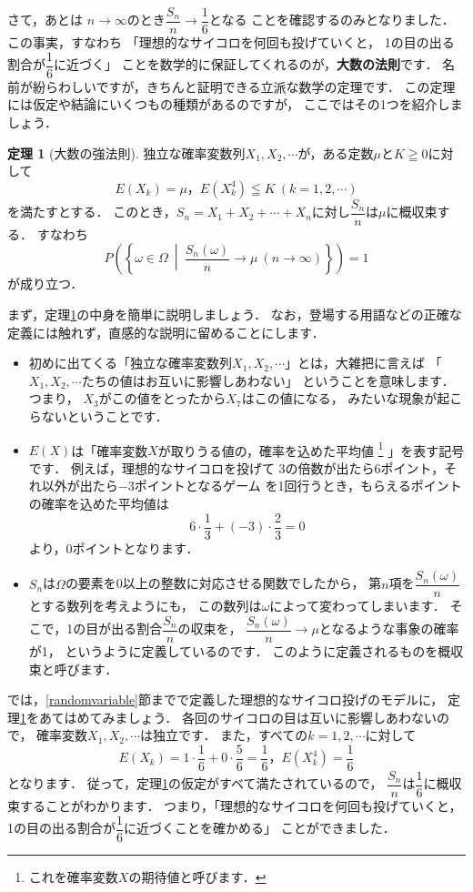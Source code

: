 \documentclass[./main]{subfiles} %
\theoremstyle{definition}
\newtheorem{hamadathm}[hamadadefi]{定理}
\begin{document}
さて，あとは
$n\to\infty$のとき$\dfrac{S_n}{n}\to\dfrac{1}{6}$となる
ことを確認するのみとなりました．
この事実，すなわち
「理想的なサイコロを何回も投げていくと，
1の目の出る割合が$\dfrac{1}{6}$に近づく」
ことを数学的に保証してくれるのが，\textbf{大数の法則}です．
名前が紛らわしいですが，きちんと証明できる立派な数学の定理です．
この定理には仮定や結論にいくつもの種類があるのですが，
ここではその1つを紹介しましょう．

\begin{hamadathm}[大数の強法則]\label{stronglawoflargenumber}
独立な確率変数列$X_1,X_2,\cdots$が，ある定数$\mu$と$K\geqq0$に対して
\[ E(X_k)=\mu，E(X_k^4)\leqq K\ (k=1,2,\cdots) \]
を満たすとする．
このとき，$S_n=X_1+X_2+\cdots+X_n$に対し$\dfrac{S_n}{n}$は$\mu$に概収束する．
すなわち
\[ P\left(\left\{\omega\in\Omega\ \middle|
\ \frac{S_n(\omega)}{n}\to\mu\ (n\to\infty)\right\}\right)=1 \]
が成り立つ．
\end{hamadathm}

まず，定理\ref{stronglawoflargenumber}の中身を簡単に説明しましょう．
なお，登場する用語などの正確な定義には触れず，直感的な説明に留めることにします．
\begin{itemize}
\item 初めに出てくる「独立な確率変数列$X_1,X_2,\cdots$」とは，大雑把に言えば
「$X_1,X_2,\cdots$たちの値はお互いに影響しあわない」
ということを意味します．つまり，
$X_3$がこの値をとったから$X_7$はこの値になる，
みたいな現象が起こらないということです．
\item $E(X)$は「確率変数$X$が取りうる値の，確率を込めた平均値
\footnote{これを確率変数$X$の期待値と呼びます．}
」を表す記号です．
例えば，理想的なサイコロを投げて
3の倍数が出たら6ポイント，それ以外が出たら$-3$ポイントとなるゲーム
を1回行うとき，もらえるポイントの確率を込めた平均値は
\[ 6\cdot\frac{1}{3}+(-3)\cdot\frac{2}{3}=0 \]
より，0ポイントとなります．
\item $S_n$は$\Omega$の要素を0以上の整数に対応させる関数でしたから，
第$n$項を$\dfrac{S_n(\omega)}{n}$とする数列を考えようにも，
この数列は$\omega$によって変わってしまいます．
そこで，1の目が出る割合$\dfrac{S_n}{n}$の収束を，
$\dfrac{S_n(\omega)}{n}\to\mu$となるような事象の確率が1，
というように定義しているのです．
このように定義されるものを概収束と呼びます．
\end{itemize}

では，\ref{randomvariable}節までで定義した理想的なサイコロ投げのモデルに，
定理\ref{stronglawoflargenumber}をあてはめてみましょう．
各回のサイコロの目は互いに影響しあわないので，
確率変数$X_1,X_2,\cdots$は独立です．
また，すべての$k=1,2,\cdots$に対して
\[ E(X_k)=1\cdot\frac{1}{6}+0\cdot\frac{5}{6}=\frac{1}{6}，
E(X_k^4)=\frac{1}{6} \]
となります．
従って，定理\ref{stronglawoflargenumber}の仮定がすべて満たされているので，
$\dfrac{S_n}{n}$は$\dfrac{1}{6}$に概収束することがわかります．
つまり，「理想的なサイコロを何回も投げていくと，
1の目の出る割合が$\dfrac{1}{6}$に近づくことを確かめる」
ことができました．
\end{document}
